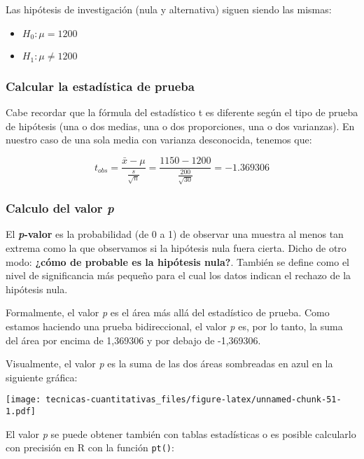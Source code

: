 \documentclass[
]{book}
\providecommand{\tightlist}{%
  \setlength{\itemsep}{0pt}\setlength{\parskip}{0pt}}
\begin{document}
Las hipótesis de investigación (nula y alternativa) siguen siendo las mismas:

\begin{itemize}
\tightlist
\item
  \(H_0:\mu= 1200\)
\item
  \(H_1:\mu\ne 1200\)
\end{itemize}

\hypertarget{calcular-la-estaduxedstica-de-prueba-1}{%
\subsubsection{Calcular la estadística de prueba}\label{calcular-la-estaduxedstica-de-prueba-1}}

Cabe recordar que la fórmula del estadístico t es diferente según el tipo de prueba de hipótesis (una o dos medias, una o dos proporciones, una o dos varianzas). En nuestro caso de una sola media con varianza desconocida, tenemos que:

\[t_{obs} = \frac{\bar{x} - \mu}{\frac{s}{\sqrt{n}}} = \frac{1150 - 1200}{\frac{200}{\sqrt{30}}} = -1.369306\]

\hypertarget{calculo-del-valor-p}{%
\subsubsection{\texorpdfstring{Calculo del valor \emph{p}}{Calculo del valor p}}\label{calculo-del-valor-p}}

El \textbf{\emph{p}-valor} es la probabilidad (de 0 a 1) de observar una muestra al menos tan extrema como la que observamos si la hipótesis nula fuera cierta. Dicho de otro modo: \textbf{¿cómo de probable es la hipótesis nula?}. También se define como el nivel de significancia más pequeño para el cual los datos indican el rechazo de la hipótesis nula.

Formalmente, el valor \emph{p} es el área más allá del estadístico de prueba. Como estamos haciendo una prueba bidireccional, el valor \emph{p} es, por lo tanto, la suma del área por encima de 1,369306 y por debajo de -1,369306.

Visualmente, el valor \emph{p} es la suma de las dos áreas sombreadas en azul en la siguiente gráfica:

\texttt{[image: tecnicas-cuantitativas\_files/figure-latex/unnamed-chunk-51-1.pdf]}

El valor \emph{p} se puede obtener también con tablas estadísticas o es posible calcularlo con precisión en R con la función \texttt{pt()}:
\end{document}
